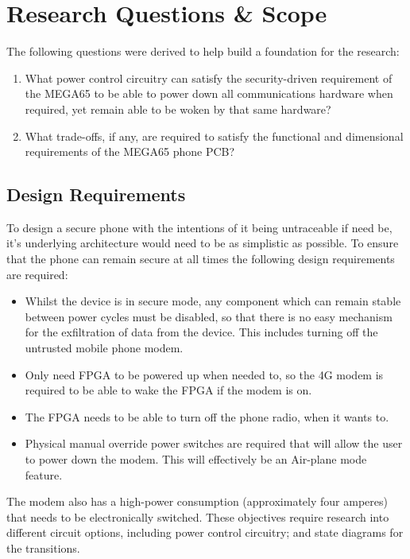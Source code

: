 
\section{Research Questions \& Scope}
The following questions were derived to help build a foundation for the research:
\begin{enumerate}
\item What power control circuitry can satisfy the security-driven requirement of the MEGA65 to be able to power down all communications hardware when required, yet remain able to be woken by that same hardware?
\item What trade-offs, if any, are required to satisfy the functional and dimensional requirements of the MEGA65 phone PCB?
\end{enumerate}

\subsection{Design Requirements}

To design a secure phone with the intentions of it being untraceable if need be, it’s underlying architecture would need to be as simplistic as possible. To ensure that the phone can remain secure at all times the following design requirements are required:
\begin{itemize}
\item Whilst the device is in secure mode, any component which can remain stable between power cycles must be disabled, so that there is no easy mechanism for the exfiltration of data from the device. This includes turning off the untrusted mobile phone modem. 
\item Only need FPGA to be powered up when needed to, so the 4G modem is required to be able to wake the FPGA if the modem is on.
\item The FPGA needs to be able to turn off the phone radio, when it wants to.
\item Physical manual override power switches are required that will allow the user to power down the modem. This will effectively be an Air-plane mode feature. 
\end{itemize}
The modem also has a high-power consumption (approximately four amperes) that needs to be electronically switched. These objectives require research into different circuit options, including power control circuitry; and state diagrams for the transitions.

